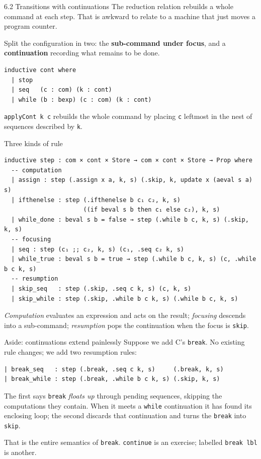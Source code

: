 \documentclass[aspectratio=169,10pt]{beamer}
\newcommand{\code}[1]{\texttt{\small #1}}
\begin{document}
\begin{frame}[fragile]{6.2 Transitions with continuations}
The reduction relation rebuilds a whole command at each step.  That is
awkward to relate to a machine that just moves a program counter.
\medskip

Split the configuration in two: the \textbf{sub-command under focus}, and a
\textbf{continuation} recording what remains to be done.
\begin{lstlisting}
inductive cont where
  | stop
  | seq   (c : com) (k : cont)
  | while (b : bexp) (c : com) (k : cont)
\end{lstlisting}
\code{applyCont k c} rebuilds the whole command by placing \code{c} leftmost
in the nest of sequences described by \code{k}.
\end{frame}

\begin{frame}[fragile]{Three kinds of rule}
\begin{lstlisting}
inductive step : com × cont × Store → com × cont × Store → Prop where
  -- computation
  | assign : step (.assign x a, k, s) (.skip, k, update x (aeval s a) s)
  | ifthenelse : step (.ifthenelse b c₁ c₂, k, s)
                      ((if beval s b then c₁ else c₂), k, s)
  | while_done : beval s b = false → step (.while b c, k, s) (.skip, k, s)
  -- focusing
  | seq : step (c₁ ;; c₂, k, s) (c₁, .seq c₂ k, s)
  | while_true : beval s b = true → step (.while b c, k, s) (c, .while b c k, s)
  -- resumption
  | skip_seq   : step (.skip, .seq c k, s) (c, k, s)
  | skip_while : step (.skip, .while b c k, s) (.while b c, k, s)
\end{lstlisting}
\emph{Computation} evaluates an expression and acts on the result;
\emph{focusing} descends into a sub-command; \emph{resumption} pops the
continuation when the focus is \code{skip}.
\end{frame}

\begin{frame}[fragile]{Aside: continuations extend painlessly}
Suppose we add C's \code{break}.  No existing rule changes; we add two
resumption rules:
\begin{lstlisting}
| break_seq   : step (.break, .seq c k, s)     (.break, k, s)
| break_while : step (.break, .while b c k, s) (.skip, k, s)
\end{lstlisting}
\medskip

The first says \code{break} \emph{floats up} through pending sequences,
skipping the computations they contain.  When it meets a \code{while}
continuation it has found its enclosing loop; the second discards that
continuation and turns the \code{break} into \code{skip}.
\medskip

That is the entire semantics of \code{break}.  \code{continue} is an
exercise; labelled \code{break lbl} is another.
\end{frame}
\end{document}
